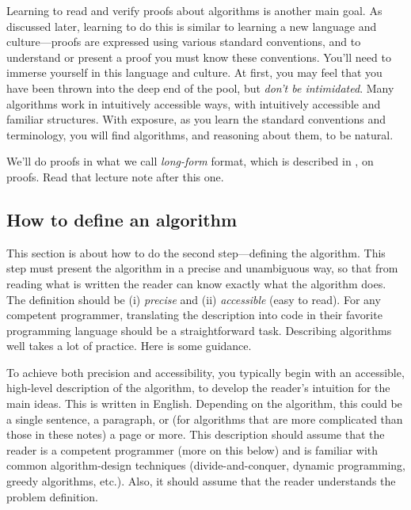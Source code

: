 \documentclass[11pt]{article}
\begin{document}
Learning to read and verify proofs about algorithms is another main goal.  As discussed later, learning to do this is similar to learning a new language and culture---proofs are expressed using various standard conventions, and to understand or present a proof you must know these conventions.  You'll need to immerse yourself in this language and culture.  At first, you may feel that you have been thrown into the deep end of the pool, but \emph{don't be intimidated}.  Many algorithms work in intuitively accessible ways, with intuitively accessible and familiar structures.  With exposure, as you learn the standard conventions and terminology, you will find algorithms, and reasoning about them, to be natural.

We'll do proofs in what we call \emph{long-form} format,
which is described in , on proofs.
Read that lecture note after this one.


\subsection{How to define an algorithm}\label{prelim: sec: algorithm}



This section is about how to do the second step---defining the algorithm.
This step must present the algorithm in a precise and unambiguous way, so that from reading what is written the reader can know exactly what the algorithm does.  The definition should be (i) \emph{precise} and (ii) \emph{accessible} (easy to read).
For any competent programmer, translating the description into code in their favorite programming language should be a straightforward task.  Describing algorithms well takes a lot of practice.  Here is some guidance.

To achieve both precision and accessibility, you typically begin with an accessible, high-level description of the algorithm, to develop the reader's intuition for the main ideas.  This is written in English.  Depending on the algorithm, this could be a single sentence, a paragraph, or (for algorithms that are more complicated than those in these notes) a page or more.  This description should assume that the reader is a competent programmer (more on this below)
and is familiar with common algorithm-design techniques
(divide-and-conquer, dynamic programming, greedy algorithms, etc.).
Also, it should assume that the reader understands the problem definition.
\end{document}
